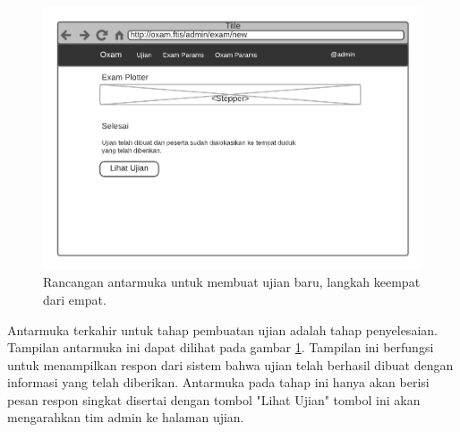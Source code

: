     
    \begin{figure}
        \centering
        \includegraphics{Gambar/mockups/Mockup--Admin - NewExam-Step 4.pdf}
        \caption{Rancangan antarmuka untuk membuat ujian baru, langkah keempat dari empat.}
        \label{fig:mockup_admin_exam_create-4}
    \end{figure}
    Antarmuka terkahir untuk tahap pembuatan ujian adalah tahap penyelesaian.
    Tampilan antarmuka ini dapat dilihat pada gambar
    \ref{fig:mockup_admin_exam_create-4}. Tampilan ini berfungsi untuk
    menampilkan respon dari sistem bahwa ujian telah berhasil dibuat dengan
    informasi yang telah diberikan. Antarmuka pada tahap ini hanya akan berisi
    pesan respon singkat disertai dengan tombol "Lihat Ujian" tombol ini akan
    mengarahkan tim admin ke halaman ujian.
    

